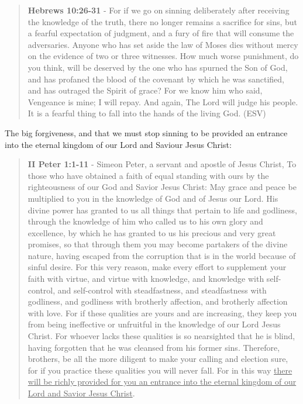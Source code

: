 \documentclass[11pt]{article}
\begin{document}
\begin{quote}
\textbf{Hebrews 10:26-31} - For if we go on sinning deliberately after receiving the knowledge of the truth, there no longer remains a sacrifice for sins, but a fearful expectation of judgment, and a fury of fire that will consume the adversaries. Anyone who has set aside the law of Moses dies without mercy on the evidence of two or three witnesses. How much worse punishment, do you think, will be deserved by the one who has spurned the Son of God, and has profaned the blood of the covenant by which he was sanctified, and has outraged the Spirit of grace? For we know him who said, Vengeance is mine; I will repay. And again, The Lord will judge his people. It is a fearful thing to fall into the hands of the living God. (ESV)
\end{quote}

The big forgiveness, and that we must stop sinning to be provided an entrance into the eternal kingdom of our Lord and Saviour Jesus Christ:

\begin{quote}
\textbf{II Peter 1:1-11} - Simeon Peter, a servant and apostle of Jesus Christ, To those who have obtained a faith of equal standing with ours by the righteousness of our God and Savior Jesus Christ: May grace and peace be multiplied to you in the knowledge of God and of Jesus our Lord.  His divine power has granted to us all things that pertain to life and godliness, through the knowledge of him who called us to his own glory and excellence, by which he has granted to us his precious and very great promises, so that through them you may become partakers of the divine nature, having escaped from the corruption that is in the world because of sinful desire.  For this very reason, make every effort to supplement your faith with virtue, and virtue with knowledge, and knowledge with self-control, and self-control with steadfastness, and steadfastness with godliness, and godliness with brotherly affection, and brotherly affection with love.  For if these qualities are yours and are increasing, they keep you from being ineffective or unfruitful in the knowledge of our Lord Jesus Christ.  For whoever lacks these qualities is so nearsighted that he is blind, having forgotten that he was cleansed from his former sins.  Therefore, brothers, be all the more diligent to make your calling and election sure, for if you practice these qualities you will never fall.  For in this way \uline{there will be richly provided for you an entrance into the eternal kingdom of our Lord and Savior Jesus Christ}.
\end{quote}
\end{document}

